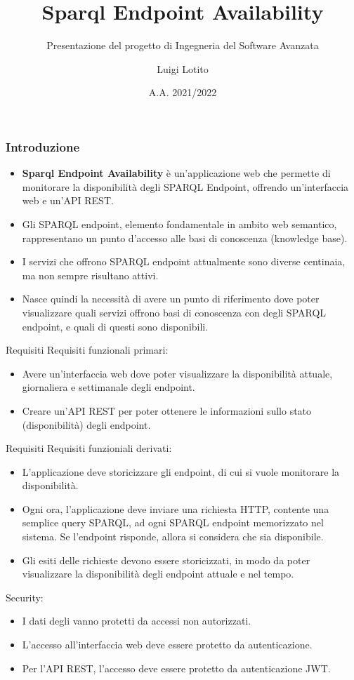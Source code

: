 \documentclass[8pt]{beamer}
\title{Sparql Endpoint Availability}
\subtitle{Presentazione del progetto di Ingegneria del Software Avanzata}
\author{Luigi Lotito}
\date{A.A. 2021/2022}
\begin{document}
\begin{frame}
    \titlepage
\end{frame}

\begin{frame}
    \frametitle{Introduzione}
    \begin{itemize}
        \item \textbf{Sparql Endpoint Availability} è un'applicazione web
              che permette di monitorare la disponibilità
              degli SPARQL Endpoint, offrendo un'interfaccia web e un'API REST.
        \item Gli SPARQL endpoint, elemento fondamentale in ambito web semantico, rappresentano un punto d'accesso alle basi di conoscenza (knowledge base).
        \item I servizi che offrono SPARQL endpoint attualmente sono diverse centinaia, ma non sempre risultano attivi.
        \item Nasce quindi la necessità di avere un punto di riferimento dove poter visualizzare quali servizi offrono basi di conoscenza con degli SPARQL endpoint, e quali di questi sono disponibili.
    \end{itemize}
\end{frame}

\begin{frame}{Requisiti}
    Requisiti funzionali primari:
    \begin{itemize}
        \item Avere un'interfaccia web dove poter visualizzare la disponibilità attuale, giornaliera e settimanale degli endpoint.
        \item Creare un'API REST per poter ottenere le informazioni sullo stato (disponibilità) degli endpoint.
    \end{itemize}
\end{frame}

\begin{frame}{Requisiti}
    Requisiti funzioniali derivati:
    \begin{itemize}
        \item L'applicazione deve storicizzare gli endpoint, di cui si vuole monitorare la disponibilità.
        \item Ogni ora, l'applicazione deve inviare una richiesta HTTP, contente una semplice query SPARQL, ad ogni SPARQL endpoint memorizzato nel sistema. Se l'endpoint risponde, allora si considera che sia disponibile.
        \item Gli esiti delle richieste devono essere storicizzati, in modo da poter visualizzare la disponibilità degli endpoint attuale e nel tempo.
    \end{itemize}
    Security:
    \begin{itemize}
        \item I dati degli vanno protetti da accessi non autorizzati.
        \item L'accesso all'interfaccia web deve essere protetto da autenticazione.
        \item Per l'API REST, l'accesso deve essere protetto da autenticazione JWT.
    \end{itemize}
\end{frame}
\end{document}
